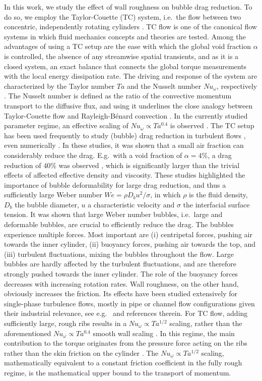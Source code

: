 \documentclass{jfm}
\newcommand{\Ta}{T\!a}
\newcommand{\We}{W\!e}
\newcommand{\Nuw}{N\!u_{\omega}}
\begin{document}
In this work, we study the effect of wall roughness on bubble drag reduction. To do so, we employ the Taylor-Couette (TC) system, i.e.\ the flow between two concentric, independently rotating cylinders \citep{far14,gro16}. TC flow is one of the canonical flow systems in which fluid mechanics concepts and theories are tested. Among the advantages of using a TC setup are the ease with which the global void fraction $\alpha$ is controlled, the absence of any streamwise spatial transients, and as it is a closed system, an exact balance that  connects the global torque measurements with the local energy dissipation rate. The driving and response of the system are characterized by the Taylor number $\Ta$ and the Nusselt number $\Nuw$, respectively \citep{gro16}. The Nusselt number is defined as the ratio of the convective momentum transport to the diffusive flux, and using it underlines the close analogy between Taylor-Couette flow and Rayleigh-B\'enard convection \citep*{eck07b}. In the currently studied parameter regime, an effective scaling of $\Nuw \propto \Ta^{0.4}$ is observed \citep{gil11}.
 The TC setup has been used frequently to study (bubble) drag reduction in turbulent flows \citep{ber05,gil13,ver16,ros16,sar16}, even numerically \citep{sug08b,spa17}. In these studies, it was shown that a small air fraction can considerably reduce the drag. E.g.\ with a void fraction of $\alpha=4\%$, a drag reduction of $40\%$ was observed \citep{gil13,ver16}, which is significantly larger than the trivial effects of affected effective density and viscosity. These studies highlighted the importance of bubble deformability for large drag reduction, and thus a sufficiently large Weber number $\We = \rho D_b u^2/\sigma $, in which $\rho$ is the fluid density, $D_b$ the bubble diameter, $u$ a characteristic velocity and $\sigma$ the interfacial surface tension. It was shown that large Weber number bubbles, i.e.\ large and deformable bubbles, are crucial to efficiently reduce the drag. The bubbles experience multiple forces. Most important are (i) centripetal forces, pushing air towards the inner cylinder, (ii) buoyancy forces, pushing air towards the top, and (iii) turbulent fluctuations, mixing the bubbles throughout the flow. Large bubbles are hardly affected by the turbulent fluctuations, and are therefore strongly pushed towards the inner cylinder. The role of the buoyancy forces decreases with increasing rotation rates. 
Wall roughness, on the other hand, obviously increases the friction. Its effects have been studied extensively for single-phase turbulence flows, mostly in pipe  or channel flow configurations given their industrial relevance, see e.g.\ \citet{mar10b,fla14} and references therein.  For TC flow, adding sufficiently large, rough ribs results in a $\Nuw \propto \Ta^{1/2}$ scaling, rather than the aforementioned $\Nuw \propto \Ta^{0.4}$ smooth wall scaling \citep{cad97,ber03,zhu18}. In this regime, the main contribution to the torque originates from the pressure force  acting on the ribs rather than the skin friction on the cylinder \cite{zhu18}.  The $\Nuw \propto \Ta^{1/2}$ scaling, mathematically equivalent to a constant friction coefficient in the fully rough regime, is the mathematical upper bound to the transport of momentum. 
\end{document}
